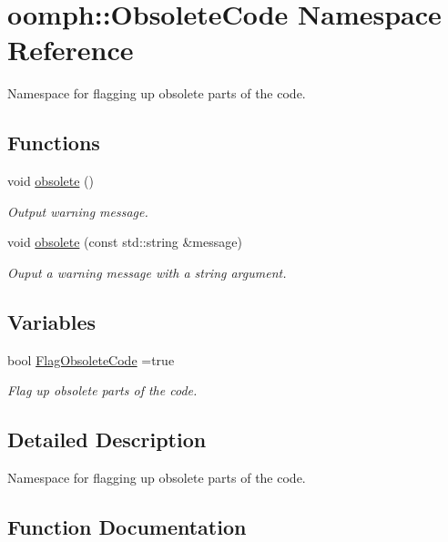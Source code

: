 \hypertarget{namespaceoomph_1_1ObsoleteCode}{}\section{oomph\+:\+:Obsolete\+Code Namespace Reference}
\label{namespaceoomph_1_1ObsoleteCode}


Namespace for flagging up obsolete parts of the code.  


\subsection*{Functions}
\begin{DoxyCompactItemize}
\item 
void \hyperlink{namespaceoomph_1_1ObsoleteCode_aad204f6339b477642ef2ef32c3437eb1}{obsolete} ()
\begin{DoxyCompactList}\small\item\em Output warning message. \end{DoxyCompactList}\item 
void \hyperlink{namespaceoomph_1_1ObsoleteCode_a4c85cdf85330cfc731338a8365a1a780}{obsolete} (const std\+::string \&message)
\begin{DoxyCompactList}\small\item\em Ouput a warning message with a string argument. \end{DoxyCompactList}\end{DoxyCompactItemize}
\subsection*{Variables}
\begin{DoxyCompactItemize}
\item 
bool \hyperlink{namespaceoomph_1_1ObsoleteCode_ab78899d2d2bb1a3b5155990811edd717}{Flag\+Obsolete\+Code} =true
\begin{DoxyCompactList}\small\item\em Flag up obsolete parts of the code. \end{DoxyCompactList}\end{DoxyCompactItemize}


\subsection{Detailed Description}
Namespace for flagging up obsolete parts of the code. 

\subsection{Function Documentation}
\mbox{\label{namespaceoomph_1_1ObsoleteCode_aad204f6339b477642ef2ef32c3437eb1}} 
